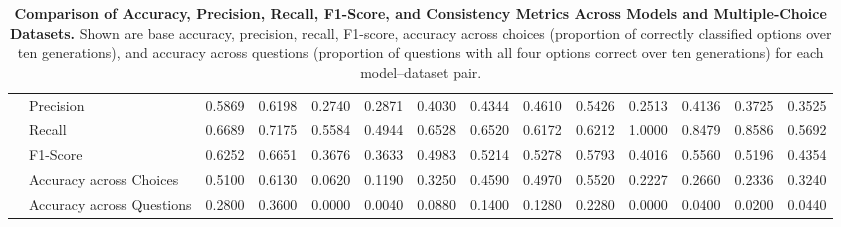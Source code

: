 \begin{table}[htbp]
{\begin{tabular}{llcccccccccccc}
 & Precision & 0.5869 & 0.6198 & 0.2740 & 0.2871 & 0.4030 & 0.4344 & 0.4610 & 0.5426 & 0.2513 & 0.4136 & 0.3725 & 0.3525 \\
 & Recall & 0.6689 & 0.7175 & 0.5584 & 0.4944 & 0.6528 & 0.6520 & 0.6172 & 0.6212 & 1.0000 & 0.8479 & 0.8586 & 0.5692 \\
 & F1-Score & 0.6252 & 0.6651 & 0.3676 & 0.3633 & 0.4983 & 0.5214 & 0.5278 & 0.5793 & 0.4016 & 0.5560 & 0.5196 & 0.4354 \\
 & Accuracy across Choices & 0.5100 & 0.6130 & 0.0620 & 0.1190 & 0.3250 & 0.4590 & 0.4970 & 0.5520 & 0.2227 & 0.2660 & 0.2336 & 0.3240 \\
 & Accuracy across Questions & 0.2800 & 0.3600 & 0.0000 & 0.0040 & 0.0880 & 0.1400 & 0.1280 & 0.2280 & 0.0000 & 0.0400 & 0.0200 & 0.0440 \\
\hline
\end{tabular}
}
\caption[Accuracy, Precision, Recall, F1, and Consistency Metrics Across Models and MC Datasets]{\textbf{Comparison of Accuracy, Precision, Recall, F1-Score, and Consistency Metrics Across Models and Multiple‐Choice Datasets.} Shown are base accuracy, precision, recall, F1-score, accuracy across choices (proportion of correctly classified options over ten generations), and accuracy across questions (proportion of questions with all four options correct over ten generations) for each model–dataset pair.}
\label{tab:your_label}
\end{table}